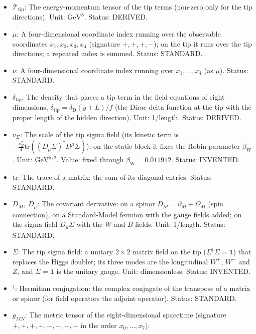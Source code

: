 \documentclass[
  10pt,
]{article}
\providecommand{\tightlist}{%
  \setlength{\itemsep}{0pt}\setlength{\parskip}{0pt}}
\begin{document}
\begin{itemize}
\tightlist
\item
  \(\mathcal{T}_{\mathrm{tip}}\): The energy-momentum tensor of the tip
  terms (non-zero only for the tip directions). Unit:
  \(\mathrm{GeV}^{8}\). Status: DERIVED.
\item
  \(\mu\): A four-dimensional coordinate index running over the
  observable coordinates \(x_1, x_2, x_3, x_4\) (signature \(+,+,+,-\));
  on the tip it runs over the tip directions; a repeated index is
  summed. Status: STANDARD.
\item
  \(\nu\): A four-dimensional coordinate index running over
  \(x_1, \dots, x_4\) (as \(\mu\)). Status: STANDARD.
\item
  \(\delta_{\mathrm{tip}}\): The density that places a tip term in the
  field equations of eight dimensions,
  \(\delta_{\mathrm{tip}} = \delta_{\mathrm{D}}(y + L)/f\) (the Dirac
  delta function at the tip with the proper length of the hidden
  direction). Unit: 1/length. Status: DERIVED.
\item
  \(v_\Sigma\): The scale of the tip sigma field (its kinetic term is
  \(-\frac{v_\Sigma^2}{4}\mathrm{tr}((D_\mu\Sigma)^\dagger D^\mu\Sigma)\));
  on the static block it fixes the Robin parameter
  \(\beta_{\mathrm{W}}\). Unit: \(\mathrm{GeV}^{5/2}\). Value: fixed
  through \(\beta_{\mathrm{W}} = 0.011912\). Status: INVENTED.
\item
  \(\mathrm{tr}\): The trace of a matrix: the sum of its diagonal
  entries. Status: STANDARD.
\item
  \(D_M,\ D_\mu\): The covariant derivative: on a spinor
  \(D_M = \partial_M + \Omega_M\) (spin connection), on a Standard-Model
  fermion with the gauge fields added; on the sigma field
  \(D_\mu\Sigma\) with the \(W\) and \(B\) fields. Unit: 1/length.
  Status: STANDARD.
\item
  \(\Sigma\): The tip sigma field: a unitary \(2 \times 2\) matrix field
  on the tip (\(\Sigma^\dagger\Sigma = \mathbf{1}\)) that replaces the
  Higgs doublet; its three modes are the longitudinal \(W^+\), \(W^-\)
  and \(Z\), and \(\Sigma = \mathbf{1}\) is the unitary gauge. Unit:
  dimensionless. Status: INVENTED.
\item
  \({}^\dagger\): Hermitian conjugation: the complex conjugate of the
  transpose of a matrix or spinor (for field operators the adjoint
  operator). Status: STANDARD.
\item
  \(g_{MN}\): The metric tensor of the eight-dimensional spacetime
  (signature \(+,+,+,+,-,-,-,-\) in the order \(x_0, \dots, x_7\)):

\end{itemize}
\end{document}
